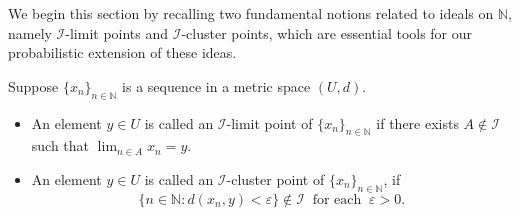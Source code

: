 \documentclass[reqno]{amsart}
\begin{document}
We begin this section by recalling two fundamental notions related to ideals on $\mathbb{N}$, namely 
$\mathcal{I}$-limit points and 
$\mathcal{I}$-cluster points, which are essential tools for our probabilistic extension of these ideas.
\begin{definition}\label{defcluster}\cite[Definition 4.1]{kostyrko2000convergence}
	Suppose $\{x_n\}_{n\in\mathbb{N}}$ is a sequence in a metric space $(U,d)$.
	\begin{itemize}
		\item[(i)] An element $y\in U$ is called an $\mathcal{I}$-limit point of $\{x_n\}_{n\in\mathbb{N}}$ if there exists $A\notin \mathcal{I}$ such that $\displaystyle\lim_{n\in A}x_n=y$.\\
		\item[(ii)] An element $y\in U$ is called an $\mathcal{I}$-cluster point of $\{x_n\}_{n\in\mathbb{N}}$, if  $$\{n\in\mathbb{N}:d(x_n,y)<\varepsilon\}\notin\mathcal{I}~\mbox{ for each }~ \varepsilon>0.$$
	\end{itemize}
\end{definition} 
\end{document}
